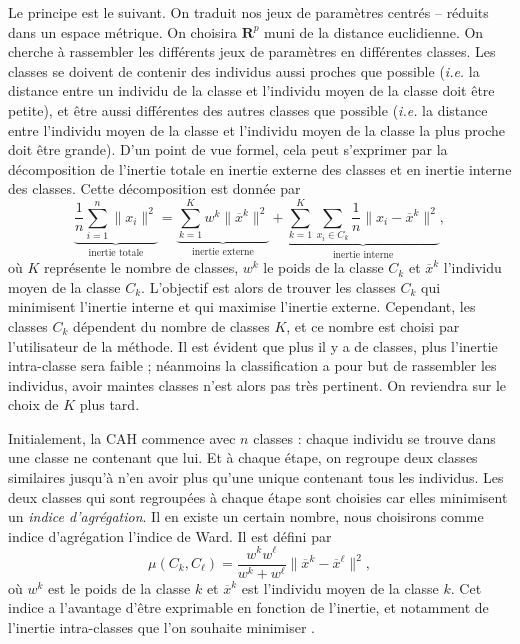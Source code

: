 Le principe est le suivant.
On traduit nos jeux de paramètres centrés -- réduits dans un espace métrique. On choisira $\mathbf{R}^p$ muni de la distance euclidienne.
On cherche à rassembler les différents jeux de paramètres en différentes classes.
Les classes se doivent de contenir des individus aussi proches que possible (\emph{i.e.} la distance entre un individu de la classe et l'individu moyen de la classe doit être petite), et être aussi différentes des autres classes que possible (\emph{i.e.} la distance entre l'individu moyen de la classe et l'individu moyen de la classe la plus proche doit être grande).
D'un point de vue formel, cela peut s'exprimer par la décomposition de l'inertie totale en inertie externe des classes et en inertie interne des classes.
Cette décomposition est donnée par
\[
\underbrace{\frac{1}{n}\sum_{i=1}^{n} \lVert x_i \rVert^2}_{\text{inertie totale}} = \underbrace{\sum_{k=1}^{K}w^k\lVert \overline{x}^{k} \rVert^2}_{\text{inertie externe}} +
\underbrace{\sum_{k=1}^{K} \sum_{x_i\in C_k} \frac{1}{n} \lVert x_i - \overline{x}^k \rVert^2}_{\text{inertie interne}},
\]
où $K$ représente le nombre de classes, $w^k$ le poids de la classe $C_k$ et $\overline{x}^{k}$ l'individu moyen de la classe $C_k$.
L'objectif est alors de trouver les classes $C_k$ qui minimisent l'inertie interne et qui maximise l'inertie externe.
Cependant, les classes $C_k$ dépendent du nombre de classes $K$, et ce nombre est choisi par l'utilisateur de la méthode.
Il est évident que plus il y a de classes, plus l'inertie intra-classe sera faible ; néanmoins la classification a pour but de rassembler les individus, avoir maintes classes n'est alors pas très pertinent.
On reviendra sur le choix de $K$ plus tard.

Initialement, la CAH commence avec $n$ classes : chaque individu se trouve dans une classe ne contenant que lui.
Et à chaque étape, on regroupe deux classes similaires jusqu'à n'en avoir plus qu'une unique contenant tous les individus.
Les deux classes qui sont regroupées à chaque étape sont choisies car elles minimisent un \emph{indice d'agrégation}.
Il en existe un certain nombre, nous choisirons comme indice d'agrégation l'indice de Ward.
Il est défini par
\[
\mu\left( C_k, C_{\ell} \right) = \frac{w^kw^{\ell}}{w^k + w^{\ell}}\lVert \overline{x}^k - \overline{x}^{\ell} \rVert^2,
\]
où $w^k$ est le poids de la classe $k$ et $\overline{x}^k$ est l'individu moyen de la classe $k$.
Cet indice a l'avantage d'être exprimable en fonction de l'inertie, et notamment de l'inertie intra-classes que l'on souhaite minimiser \citep{bry}.

